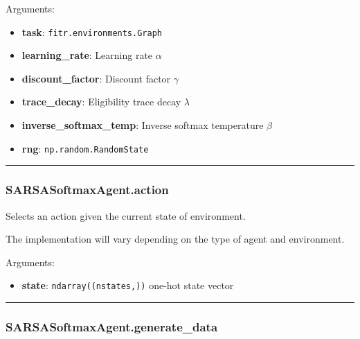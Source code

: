 Arguments:

\begin{itemize}
\tightlist
\item
  \textbf{task}: \texttt{fitr.environments.Graph}
\item
  \textbf{learning\_rate}: Learning rate \(\alpha\)
\item
  \textbf{discount\_factor}: Discount factor \(\gamma\)
\item
  \textbf{trace\_decay}: Eligibility trace decay \(\lambda\)
\item
  \textbf{inverse\_softmax\_temp}: Inverse softmax temperature \(\beta\)
\item
  \textbf{rng}: \texttt{np.random.RandomState}
\end{itemize}

\begin{center}\rule{0.5\linewidth}{\linethickness}\end{center}

\subsubsection{SARSASoftmaxAgent.action}\label{sarsasoftmaxagent.action}

\begin{Shaded}
\begin{Highlighting}[]
\end{Highlighting}
\end{Shaded}

Selects an action given the current state of environment.

The implementation will vary depending on the type of agent and
environment.

Arguments:

\begin{itemize}
\tightlist
\item
  \textbf{state}: \texttt{ndarray((nstates,))} one-hot state vector
\end{itemize}

\begin{center}\rule{0.5\linewidth}{\linethickness}\end{center}

\subsubsection{SARSASoftmaxAgent.generate\_data}\label{sarsasoftmaxagent.generate_data}

